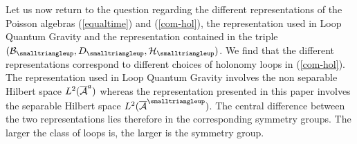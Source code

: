 \documentclass[12pt]{article}
\def\G{\Gamma}
\def\ca{{\cal A}}
\def\cb{{\cal B}}
\def\ch{{\cal H}}
\def\ck{{\cal K}}
\def\ct{{\cal T}}
\begin{document}
Let us now return to the question regarding the different representations of the Poisson algebras (\ref{equaltime}) and (\ref{com-hol}), the representation used in Loop Quantum Gravity and the representation contained in the triple $(\cb_{\smalltriangleup},D_{\smalltriangleup},\ch_\smalltriangleup)$. We find that the different representations correspond to different choices of holonomy loops in (\ref{com-hol}). The representation used in Loop Quantum Gravity involves the non separable Hilbert space $L^2(\overline{\ca}^{\small a})$ whereas the representation presented in this paper involves the separable Hilbert space $L^2(\overline{\ca}^{\smalltriangleup})$. The central difference between the two representations lies therefore in the corresponding symmetry groups. The larger the class of loops is, the larger is the symmetry group.





























































\end{document}
